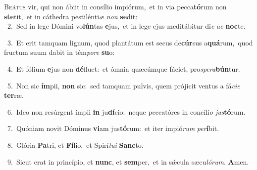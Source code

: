 \lettrine{\initial\textcolor{\initialcolor}{B}}{eátus} vir, qui non ábiit in consílio impiórum,~\dagger et in via pecca\-\textbf{tó}\-rum non \textbf{ste}\-tit,~\star et in cáthedra pestilénti\textit{æ} \textit{non} \textbf{se}\-dit:\\
{\numbfont\textcolor{\numbcolor}{~2.}}~Sed in lege Dómini vo\-\textbf{lún}\-tas \textbf{e}\-jus,~\star et in lege ejus meditábitur di\textit{e} \textit{ac} \textbf{noc}\-te.\par
{\numbfont\textcolor{\numbcolor}{~3.}}~Et erit tamquam lignum, quod plantátum est secus de\-\textbf{cúr}\-sus a\-\textbf{quá}\-rum,~\star quod fructum suum dabit in tém\-\textit{po}\-\textit{re} \textbf{su}\-o:\par
{\numbfont\textcolor{\numbcolor}{~4.}}~Et fólium \textbf{e}\-jus non \textbf{dé}\-fluet:~\star et ómnia quæcúmque fáciet, pro\-\textit{spe}\-\textit{ra}\textbf{bún}tur.\par
{\numbfont\textcolor{\numbcolor}{~5.}}~Non sic \textbf{ím}\-pii, \textbf{non} sic:~\star sed tamquam pulvis, quem prójicit ventus a fá\-\textit{ci}\-\textit{e} \textbf{ter}\-ræ.\par
{\numbfont\textcolor{\numbcolor}{~6.}}~Ideo non resúrgent ímpii \textbf{in} ju\-\textbf{dí}\-cio:~\star neque peccatóres in concíli\textit{o} \textit{jus}\-\textbf{tó}rum.\par
{\numbfont\textcolor{\numbcolor}{~7.}}~Quóniam novit Dóminus \textbf{vi}\-am jus\-\textbf{tó}\-rum:~\star et iter impió\textit{rum} \textit{per}\-\textbf{í}bit.\par
{\numbfont\textcolor{\numbcolor}{~8.}}~Glória \textbf{Pa}\-tri, et \textbf{Fí}\-lio,~\star et Spirí\-\textit{tu}\-\textit{i} \textbf{Sanc}\-to.\par
{\numbfont\textcolor{\numbcolor}{~9.}}~Sicut erat in princípio, et \textbf{nunc}\-, et \textbf{sem}\-per,~\star et in sǽcula sæcu\-\textit{ló}\-\textit{rum}. \textbf{A}\-men.\par
